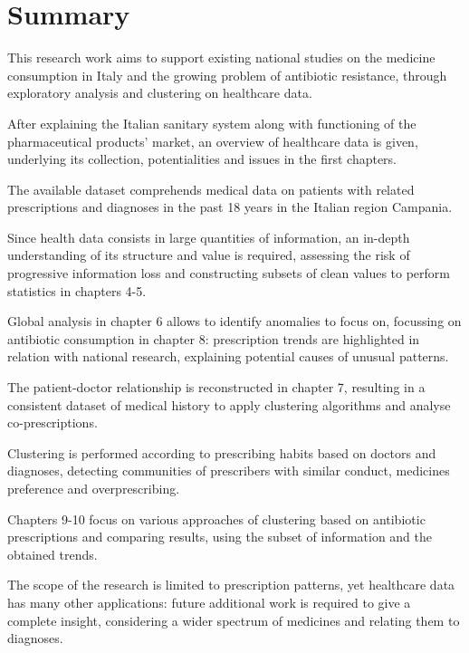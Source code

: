 \chapter{Summary}

This research work aims to support existing national studies on the medicine consumption in Italy and the growing problem of antibiotic resistance, through exploratory analysis and clustering on healthcare data.

After explaining the Italian sanitary system along with functioning of the pharmaceutical products' market, an overview of healthcare data is given, underlying its collection, potentialities and issues in the first chapters.

The available dataset comprehends medical data on patients with related prescriptions and diagnoses in the past 18 years in the Italian region Campania.

Since health data consists in large quantities of information, an in-depth understanding of its structure and value is required, assessing the risk of progressive information loss and constructing subsets of clean values to perform statistics in chapters 4-5.

Global analysis in chapter 6 allows to identify anomalies to focus on, focussing on antibiotic consumption in chapter 8: prescription trends are highlighted in relation with national research, explaining potential causes of unusual patterns.

The patient-doctor relationship is reconstructed in chapter 7, resulting in a consistent dataset of medical history to apply clustering algorithms and analyse co-prescriptions.

Clustering is performed according to prescribing habits based on doctors and diagnoses, detecting communities of prescribers with similar conduct, medicines preference and overprescribing.

Chapters 9-10 focus on various approaches of clustering based on antibiotic prescriptions and comparing results, using the subset of information and the obtained trends.

The scope of the research is limited to prescription patterns, yet healthcare data has many other applications: future additional work is required to give a complete insight, considering a wider spectrum of medicines and relating them to diagnoses.


